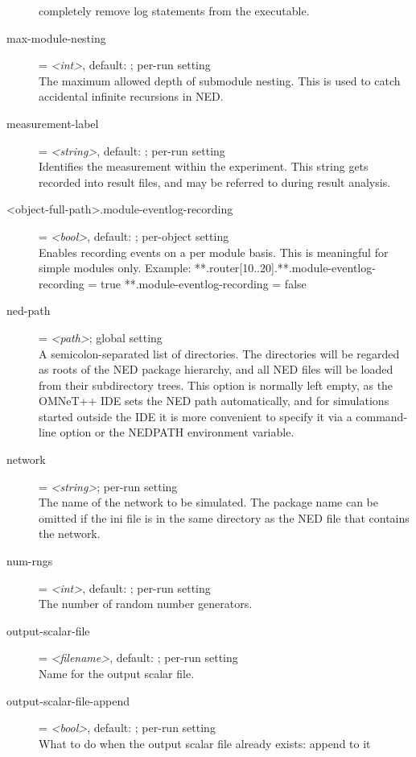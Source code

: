 \begin{description}
    completely remove log statements from the executable.
\item[max-module-nesting] = \textit{<int>}, default: ; per-run setting \\
    The maximum allowed depth of submodule nesting. This is used to catch
    accidental infinite recursions in NED.
\item[measurement-label] = \textit{<string>}, default: ; per-run setting \\
    Identifies the measurement within the experiment. This string gets recorded
    into result files, and may be referred to during result analysis.
\item[<object-full-path>.module-eventlog-recording] = \textit{<bool>}, default: ; per-object setting \\
    Enables recording events on a per module basis. This is meaningful for
    simple modules only. 
    Example:
     **.router[10..20].**.module-eventlog-recording = true
     **.module-eventlog-recording = false
\item[ned-path] = \textit{<path>}; global setting \\
    A semicolon-separated list of directories. The directories will be regarded
    as roots of the NED package hierarchy, and all NED files will be loaded
    from their subdirectory trees. This option is normally left empty, as the
    OMNeT++ IDE sets the NED path automatically, and for simulations started
    outside the IDE it is more convenient to specify it via a command-line
    option or the NEDPATH environment variable.
\item[network] = \textit{<string>}; per-run setting \\
    The name of the network to be simulated.  The package name can be omitted
    if the ini file is in the same directory as the NED file that contains the
    network.
\item[num-rngs] = \textit{<int>}, default: ; per-run setting \\
    The number of random number generators.
\item[output-scalar-file] = \textit{<filename>}, default: ; per-run setting \\
    Name for the output scalar file.
\item[output-scalar-file-append] = \textit{<bool>}, default: ; per-run setting \\
    What to do when the output scalar file already exists: append to it

\end{description}
